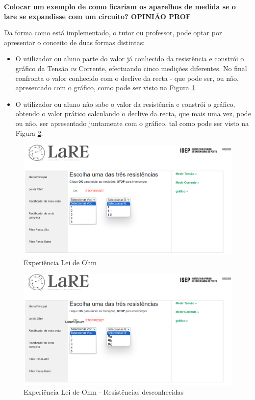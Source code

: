 \textbf{Colocar um exemplo de como ficariam os aparelhos de medida se o lare se expandisse com um circuito? OPINIÃO PROF}

Da forma como está implementado, o tutor ou professor, pode optar por apresentar o conceito de duas formas distintas:

\begin{itemize}
	\item O utilizador ou aluno parte do valor já conhecido da resistência e constrói o gráfico da Tensão \textit{vs} Corrente, efectuando cinco medições diferentes. No final confronta o valor conhecido com o declive da recta - que pode ser, ou não, apresentado com o gráfico, como pode ser visto na Figura \ref{fig:pagohm}.
	\item O utilizador ou aluno não sabe o valor da resistência e constrói o gráfico, obtendo o valor prático calculando o declive da recta, que mais uma vez, pode ou não, ser apresentado juntamente com o gráfico, tal como pode ser visto na Figura \ref{fig:pagohmabc}.
\end{itemize}

\begin{figure}[hbtp]
	\centering
	\includegraphics[width=1\textwidth]{figures/ohm_escolha.png}
	\caption{Experiência Lei de Ohm}
	\label{fig:pagohm}
\end{figure}

\begin{figure}[hbtp]
	\centering
	\includegraphics[width=1\textwidth]{figures/ohm_escolha_abc.png}
	\caption{Experiência Lei de Ohm - Resistências desconhecidas}
	\label{fig:pagohmabc}
\end{figure}

